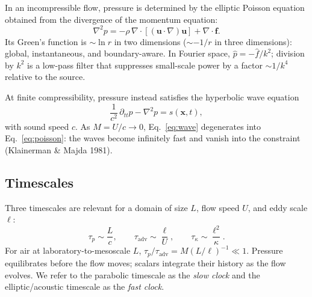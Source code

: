 \documentclass[11pt]{article}
\begin{document}
In an incompressible flow, pressure is determined by the elliptic Poisson equation
obtained from the divergence of the momentum equation:
\begin{equation}
\nabla^2 p = -\rho\,\nabla\cdot\left[(\mathbf{u}\cdot\nabla)
\mathbf{u}\right] + \nabla\cdot\mathbf{f}.
\label{eq:poisson}
\end{equation}
Its Green's function is $\sim \ln r$ in two dimensions ($\sim -1/r$ in three
dimensions): global, instantaneous, and boundary-aware. In Fourier space,
$\hat{p} = -\hat{f}/k^2$; division by $k^2$ is a low-pass filter that suppresses
small-scale power by a factor $\sim 1/k^4$ relative to the source.

At finite compressibility, pressure instead satisfies the hyperbolic wave equation
\begin{equation}
\frac{1}{c^2}\,\partial_{tt}p - \nabla^2 p = s(\mathbf{x},t),
\label{eq:wave}
\end{equation}
with sound speed $c$. As $M = U/c \to 0$, Eq.~\eqref{eq:wave} degenerates into
Eq.~\eqref{eq:poisson}: the waves become infinitely fast and vanish into the
constraint (Klainerman \& Majda 1981).

\subsection{Timescales}

Three timescales are relevant for a domain of size $L$, flow speed $U$, and eddy
scale $\ell$:
\begin{equation}
\tau_p \sim \frac{L}{c}, \qquad
\tau_{\mathrm{adv}} \sim \frac{\ell}{U}, \qquad
\tau_\kappa \sim \frac{\ell^2}{\kappa}.
\label{eq:timescales}
\end{equation}
For air at laboratory-to-mesoscale $L$,
$\tau_p/\tau_{\mathrm{adv}} = M(L/\ell)^{-1} \ll 1$. Pressure equilibrates before
the flow moves; scalars integrate their history as the flow evolves. We refer to
the parabolic timescale as the \emph{slow clock} and the elliptic/acoustic
timescale as the \emph{fast clock}.

\end{document}

